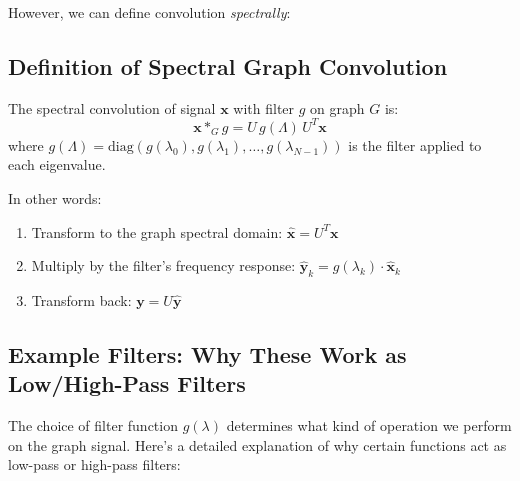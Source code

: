 \begin{notechapter}
However, we can define convolution \emph{spectrally}:

\begin{center}
\end{center}

\subsection{Definition of Spectral Graph Convolution}

\begin{definition}
The spectral convolution of signal $\mathbf{x}$ with filter $g$ on 
graph $G$ is:
\begin{equation}
\mathbf{x} *_G g = U \, g(\Lambda) \, U^T \mathbf{x}
\end{equation}
where $g(\Lambda) = \text{diag}(g(\lambda_0), g(\lambda_1), \ldots, 
g(\lambda_{N-1}))$ is the filter applied to each eigenvalue.
\end{definition}

In other words:
\begin{enumerate}
\item Transform to the graph spectral domain: 
      $\hat{\mathbf{x}} = U^T \mathbf{x}$
\item Multiply by the filter's frequency response: 
      $\hat{\mathbf{y}}_k = g(\lambda_k) \cdot \hat{\mathbf{x}}_k$
\item Transform back: $\mathbf{y} = U \hat{\mathbf{y}}$
\end{enumerate}

\subsection{Example Filters: Why These Work as Low/High-Pass Filters}

The choice of filter function $g(\lambda)$ determines what kind of 
operation we perform on the graph signal. Here's a detailed explanation 
of why certain functions act as low-pass or high-pass filters:


\end{notechapter}
